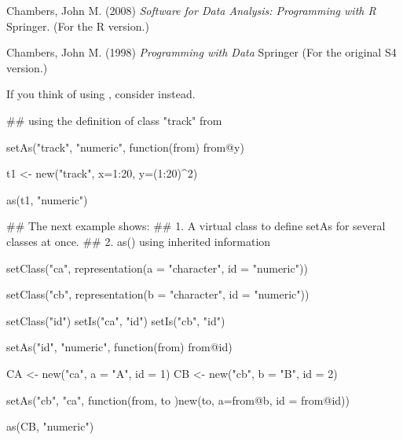 %
\begin{References}\relax
Chambers, John M. (2008)
\emph{Software for Data Analysis: Programming with R}
Springer.  (For the R version.)

Chambers, John M. (1998)
\emph{Programming with Data}
Springer (For the original S4 version.)
\end{References}
%
\begin{SeeAlso}\relax
If you think of using , consider
 instead.
\end{SeeAlso}
%
\begin{Examples}
\begin{ExampleCode}
## using the definition of class "track" from 



setAs("track", "numeric", function(from) from@y)

t1 <- new("track", x=1:20, y=(1:20)^2)

as(t1, "numeric")

## The next example shows:
##  1. A virtual class to define setAs for several classes at once.
##  2. as() using inherited information

setClass("ca", representation(a = "character", id = "numeric"))

setClass("cb", representation(b = "character", id = "numeric"))

setClass("id")
setIs("ca", "id")
setIs("cb", "id")


setAs("id", "numeric", function(from) from@id)

CA <- new("ca", a = "A", id = 1)
CB <- new("cb", b = "B", id = 2)

setAs("cb", "ca", function(from, to )new(to, a=from@b, id = from@id))

as(CB, "numeric")


\end{ExampleCode}
\end{Examples}
